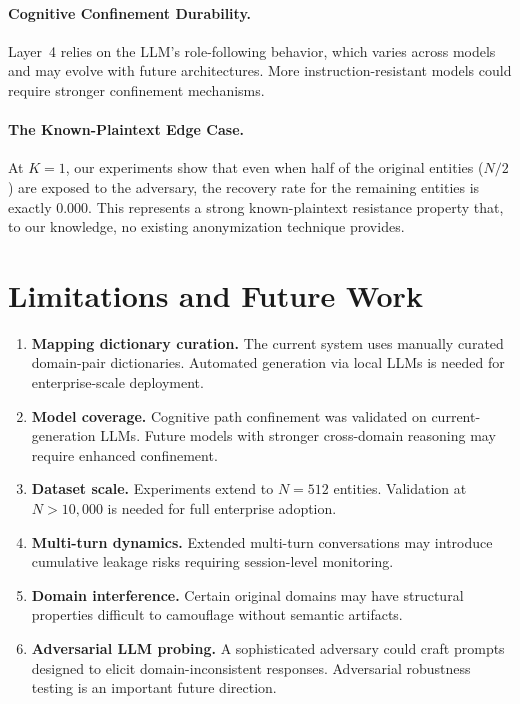 \documentclass[11pt]{article}
\begin{document}
\paragraph{Cognitive Confinement Durability.} Layer~4 relies on the LLM's role-following behavior, which varies across models and may evolve with future architectures. More instruction-resistant models could require stronger confinement mechanisms.

\paragraph{The Known-Plaintext Edge Case.} At $K=1$, our experiments show that even when half of the original entities ($N/2$) are exposed to the adversary, the recovery rate for the remaining entities is exactly 0.000. This represents a strong known-plaintext resistance property that, to our knowledge, no existing anonymization technique provides.

\section{Limitations and Future Work}

\begin{enumerate}
\item \textbf{Mapping dictionary curation.} The current system uses manually curated domain-pair dictionaries. Automated generation via local LLMs is needed for enterprise-scale deployment.

\item \textbf{Model coverage.} Cognitive path confinement was validated on current-generation LLMs. Future models with stronger cross-domain reasoning may require enhanced confinement.

\item \textbf{Dataset scale.} Experiments extend to $N=512$ entities. Validation at $N > 10{,}000$ is needed for full enterprise adoption.

\item \textbf{Multi-turn dynamics.} Extended multi-turn conversations may introduce cumulative leakage risks requiring session-level monitoring.

\item \textbf{Domain interference.} Certain original domains may have structural properties difficult to camouflage without semantic artifacts.

\item \textbf{Adversarial LLM probing.} A sophisticated adversary could craft prompts designed to elicit domain-inconsistent responses. Adversarial robustness testing is an important future direction.
\end{enumerate}
\end{document}
